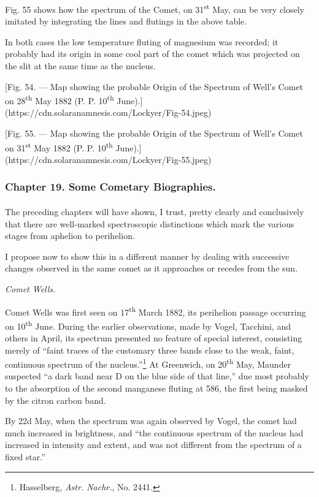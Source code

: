 \documentclass[a4paper, 12pt, oneside, polutonikogreek, english]{article}
\begin{document}
Fig. 55 shows how the spectrum of the Comet, on 31\textsuperscript{st} May, can be very closely imitated by integrating the lines and flutings in the above table.

In both cases the low temperature fluting of magnesium was recorded; it probably had its origin in some cool part of the comet which was projected on the slit at the same time as the nucleus.

[Fig. 54. --- Map showing the probable Origin of the Spectrum of Well's Comet on 28\textsuperscript{th} May 1882 (P. P. 10\textsuperscript{th} June).](https://cdn.solaranamnesis.com/Lockyer/Fig-54.jpeg)

[Fig. 55. --- Map showing the probable Origin of the Spectrum of Well's Comet on 31\textsuperscript{st} May 1882 (P. P. 10\textsuperscript{th} June).](https://cdn.solaranamnesis.com/Lockyer/Fig-55.jpeg)
\clearpage
\subsubsection{Chapter 19. Some Cometary Biographies.}
\paragraph{}
The preceding chapters will have shown, I trust, pretty clearly and conclusively that there are well-marked spectroscopic distinctions which mark the various stages from aphelion to perihelion.

I propose now to show this in a different manner by dealing with successive changes observed in the same comet as it approaches or recedes from the sun.

\emph{Comet Wells.}

Comet Wells was first seen on 17\textsuperscript{th} March 1882, its perihelion passage occurring on 10\textsuperscript{th} June. During the earlier observations, made by Vogel, Tacchini, and others in April, its spectrum presented no feature of special interest, consisting merely of ``faint traces of the customary three bands close to the weak, faint, continuous spectrum of the nucleus.''\footnote{Hasselberg, \emph{Astr. Nachr.}, No. 2441.} At Greenwich, on 20\textsuperscript{th} May, Maunder suspected ``a dark band near D on the blue side of that line,'' due most probably to the absorption of the second manganese fluting at 586, the first being masked by the citron carbon band.

By 22d May, when the spectrum was again observed by Vogel, the comet had much increased in brightness, and ``the continuous spectrum of the nucleus had increased in intensity and extent, and was not different from the spectrum of a fixed star.''
\end{document}
